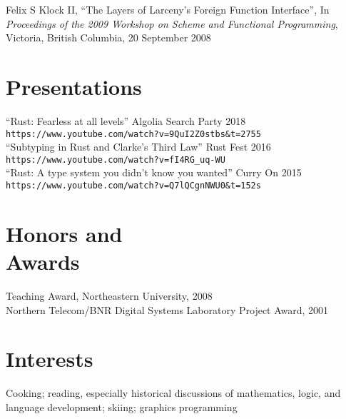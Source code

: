 \documentclass[margin,line,draft]{res}
\newcommand{\mysidestyle}{\sc}
\begin{document}
\begin{resume}
\vspace{-2mm}

    Felix S Klock II, ``The Layers of Larceny's Foreign Function Interface'', 
    In \textsl{Proceedings of the 2009 Workshop on Scheme and Functional Programming}, Victoria, British Columbia, 20 September 2008

    \section{\mysidestyle Presentations}
    ``Rust: Fearless at all levels'' Algolia Search Party 2018\\ \verb|https://www.youtube.com/watch?v=9QuI2Z0stbs&t=2755|\\
    ``Subtyping in Rust and Clarke's Third Law'' Rust Fest 2016\\ \verb|https://www.youtube.com/watch?v=fI4RG_uq-WU|\\
    ``Rust: A type system you didn't know you wanted'' Curry On 2015\\ \verb|https://www.youtube.com/watch?v=Q7lQCgnNWU0&t=152s|\\
    \section{\mysidestyle Honors and\\Awards} 

    Teaching Award, Northeastern University, 2008 \vspace{1mm}\\%
    Northern Telecom/BNR Digital Systems Laboratory Project Award, 2001


    \section{\mysidestyle Interests}

    Cooking; 
    reading, especially historical discussions of mathematics, logic, 
    and language development; 
    skiing; 
    graphics programming

\end{resume}
\end{document}
